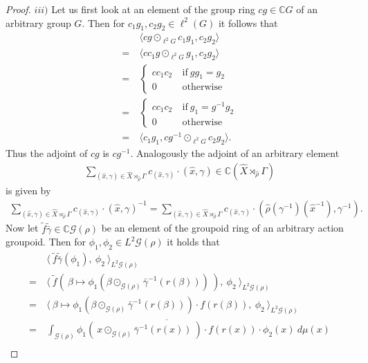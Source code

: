 \documentclass[12pt,a4paper]{scrartcl}
\theoremstyle{plain}
\theoremstyle{definition}
\newcommand{\C}{\mathbb{C}} %
\newcommand{\2}{\mathbb{Z} / 2 \mathbb{Z}}
\newcommand{\G}{\mathcal{G}}
\newcommand{\1}{\bar{1}}
\newcommand{\0}{\bar{0}}
\begin{document}
\begin{proof}
	$iii)$ Let us first look at an element of the group ring $c g \in \C G$ of an arbitrary group $G$. Then for $c_1 g_1, c_2 g_2 \in \ell^2(G)$ it follows that 
	\begin{align*}
		 &~ \langle c g \odot_{\ell^2G} c_1 g_1, c_2 g_2 \rangle \\
		=&~ \langle c c_1 g \odot_{\ell^2G} g_1, c_2 g_2 \rangle \\
		=&~ \begin{cases}
		 	c c_1 c_2 &~ \text{if} \ g g_1 = g_2 \\
		 	0 &~ \text{otherwise}
		\end{cases} \\
		=&~ \begin{cases}
		c c_1 c_2 & ~\text{if} \ g_1 = g^{-1} g_2 \\
		0 & ~\text{otherwise}
		\end{cases} \\
		=&~ \langle  c_1 g_1, c g^{-1} \odot_{\ell^2G} c_2 g_2 \rangle.
	\end{align*}
	Thus the adjoint of $cg$ is $cg^{-1}$. Analogously the adjoint of an arbitrary element
	\begin{align*}
		\sum_{(\hat{x}, \gamma) \in \hat{X} \rtimes_{\hat{\rho}} \Gamma} c_{(\hat{x}, \gamma)} \cdot (\hat{x}, \gamma) \in \C(\hat{X} \rtimes_{\hat{\rho}} \Gamma)
	\end{align*}
	is given by 
	\begin{align*}
		\sum_{(\hat{x}, \gamma) \in \hat{X} \rtimes_{\hat{\rho}} \Gamma} c_{(\hat{x}, \gamma)} \cdot (\hat{x}, \gamma)^{-1} = \sum_{(\hat{x}, \gamma) \in \hat{X} \rtimes_{\hat{\rho}} \Gamma} c_{(\hat{x}, \gamma)} \cdot (\hat{\rho}(\gamma^{-1})(\hat{x}^{-1}), \gamma^{-1}).
	\end{align*}
	Now let $\tilde{f}  \widetilde{\bar{\gamma}} \in \C \G(\rho)$ be an element of the groupoid ring of an arbitrary action groupoid. Then for $\phi_1, \phi_2 \in L^2 \G(\rho)$ it holds that
	\begin{align*}
		 &~ \langle ~\tilde{f} \widetilde{\bar{\gamma}}  (\phi_1),~ \phi_2 ~\rangle_{L^2 \G(\rho)} \\
		=&~ \langle ~\tilde{f}(~\beta \mapsto \phi_1(\beta \odot_{\G (\rho)} \bar \gamma ^{-1} (r(\beta)))~) ,~ \phi_2 ~\rangle_{L^2 \G(\rho)} \\
		=&~ \langle ~\beta \mapsto \phi_1(\beta \odot_{\G (\rho)} \bar \gamma ^{-1} (r(\beta))) \cdot f(r(\beta)) ,~ \phi_2 ~\rangle_{L^2 \G(\rho)} \\
		=&~ \int_{\G (\rho)} \overline{\phi_1(~x \odot_{\G (\rho)} \bar{\gamma}^{-1}(r(x))~) \cdot f(r(x))} \cdot \phi_2 (x) ~ d \mu (x) \\

\end{align*}
\end{proof}
\end{document}
